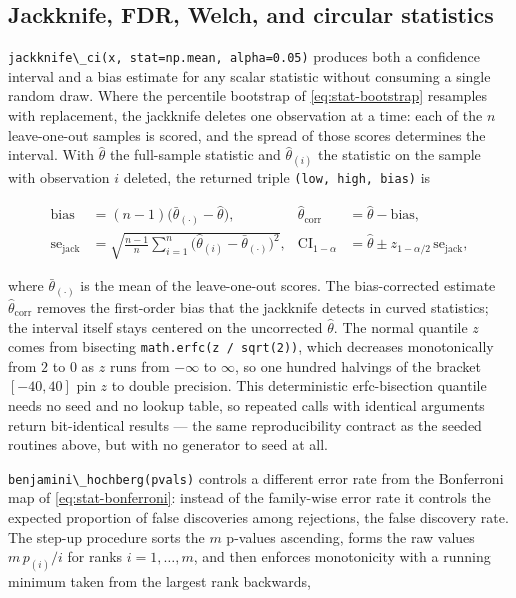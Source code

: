 \documentclass[
  10pt,
]{article}
\newcommand{\passthrough}[1]{#1}
\begin{document}
\subsection{Jackknife, FDR, Welch, and circular
statistics}\label{sec:jackknife_fdr_welch_circular}

\passthrough{\lstinline!jackknife\_ci(x, stat=np.mean, alpha=0.05)!}
produces both a confidence interval and a bias estimate for any scalar
statistic without consuming a single random draw. Where the percentile
bootstrap of \eqref{eq:stat-bootstrap} resamples with replacement, the
jackknife deletes one observation at a time: each of the \(n\)
leave-one-out samples is scored, and the spread of those scores
determines the interval. With \(\hat{\theta}\) the full-sample statistic
and \(\hat{\theta}_{(i)}\) the statistic on the sample with observation
\(i\) deleted, the returned triple
\passthrough{\lstinline!(low, high, bias)!} is

\begin{equation}
\label{eq:stat-jackknife}
\begin{aligned}
\mathrm{bias} &= (n-1)\big(\bar{\theta}_{(\cdot)} - \hat{\theta}\big), &
\hat{\theta}_{\text{corr}} &= \hat{\theta} - \mathrm{bias}, \\
\mathrm{se}_{\text{jack}} &=
\sqrt{\tfrac{n-1}{n} \sum_{i=1}^{n} \big(\hat{\theta}_{(i)} -
\bar{\theta}_{(\cdot)}\big)^{2}}, &
\mathrm{CI}_{1-\alpha} &=
\hat{\theta} \pm z_{1-\alpha/2}\,\mathrm{se}_{\text{jack}},
\end{aligned}
\end{equation}

where \(\bar{\theta}_{(\cdot)}\) is the mean of the leave-one-out
scores. The bias-corrected estimate \(\hat{\theta}_{\text{corr}}\)
removes the first-order bias that the jackknife detects in curved
statistics; the interval itself stays centered on the uncorrected
\(\hat{\theta}\). The normal quantile \(z\) comes from bisecting
\passthrough{\lstinline!math.erfc(z / sqrt(2))!}, which decreases
monotonically from \(2\) to \(0\) as \(z\) runs from \(-\infty\) to
\(\infty\), so one hundred halvings of the bracket \([-40, 40]\) pin
\(z\) to double precision. This deterministic erfc-bisection quantile
needs no seed and no lookup table, so repeated calls with identical
arguments return bit-identical results --- the same reproducibility
contract as the seeded routines above, but with no generator to seed at
all.

\passthrough{\lstinline!benjamini\_hochberg(pvals)!} controls a
different error rate from the Bonferroni map of
\eqref{eq:stat-bonferroni}: instead of the family-wise error rate it
controls the expected proportion of false discoveries among rejections,
the false discovery rate. The step-up procedure sorts the \(m\) p-values
ascending, forms the raw values \(m\,p_{(i)} / i\) for ranks
\(i = 1,\dots,m\), and then enforces monotonicity with a running minimum
taken from the largest rank backwards,
\end{document}
